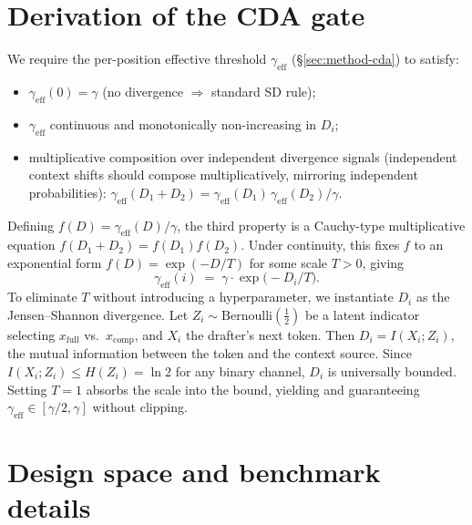 \documentclass[11pt]{article}
\theoremstyle{plain}
\theoremstyle{definition}
\begin{document}
\section{Derivation of the CDA gate}
\label{appx:cda-derivation}
We require the per-position effective threshold $\gamma_{\text{eff}}$ (\S\ref{sec:method-cda}) to satisfy:
\begin{itemize}\itemsep0pt
\item $\gamma_{\text{eff}}(0)=\gamma$ (no divergence $\Rightarrow$ standard SD rule);
\item $\gamma_{\text{eff}}$ continuous and monotonically non-increasing in $D_i$;
\item multiplicative composition over independent divergence signals (independent context shifts should compose multiplicatively, mirroring independent probabilities): $\gamma_{\text{eff}}(D_1+D_2)=\gamma_{\text{eff}}(D_1)\,\gamma_{\text{eff}}(D_2)/\gamma$.
\end{itemize}
Defining $f(D)=\gamma_{\text{eff}}(D)/\gamma$, the third property is a Cauchy-type multiplicative equation $f(D_1{+}D_2)=f(D_1)f(D_2)$. Under continuity, this fixes $f$ to an exponential form $f(D)=\exp(-D/T)$ for some scale $T>0$, giving
\begin{equation}
\gamma_{\text{eff}}(i)\;=\;\gamma\cdot\exp\bigl(-D_i/T\bigr).
\label{eq:gamma-eff}
\end{equation}
To eliminate $T$ without introducing a hyperparameter, we instantiate $D_i$ as the Jensen--Shannon divergence. Let $Z_i\sim\mathrm{Bernoulli}(\tfrac12)$ be a latent indicator selecting $x_{\text{full}}$ vs.\ $x_{\text{comp}}$, and $X_i$ the drafter's next token. Then $D_i = I(X_i;Z_i)$, the mutual information between the token and the context source. Since $I(X_i;Z_i) \le H(Z_i) = \ln 2$ for any binary channel, $D_i$ is universally bounded. Setting $T=1$ absorbs the scale into the bound, yielding  and guaranteeing $\gamma_{\text{eff}}\in[\gamma/2,\gamma]$ without clipping.

\section{Design space and benchmark details}
\label{appx:setup-detail}
\end{document}
